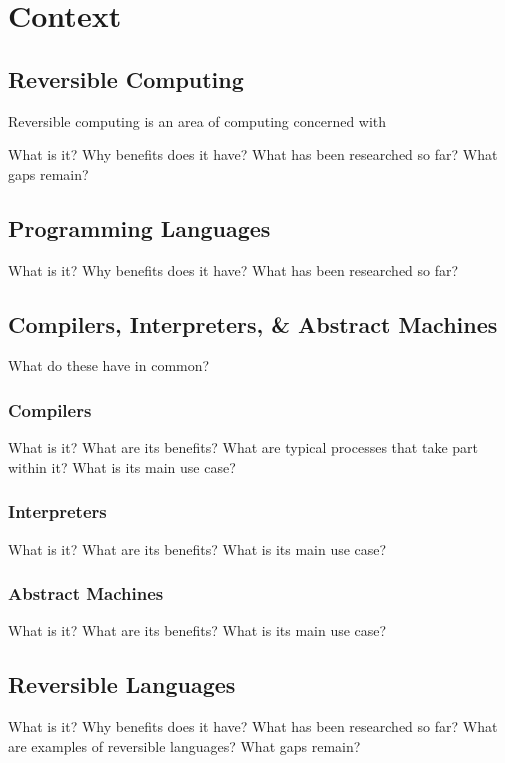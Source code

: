 \chapter{Context}


\section{Reversible Computing}

Reversible computing is an area of computing concerned with 

What is it?
Why benefits does it have?
What has been researched so far?
What gaps remain?

\section{Programming Languages}

What is it?
Why benefits does it have?
What has been researched so far?

\section{Compilers, Interpreters, \& Abstract Machines}

What do these have in common?

\subsection{Compilers}

What is it?
What are its benefits?
What are typical processes that take part within it?
What is its main use case?

\subsection{Interpreters}

What is it?
What are its benefits?
What is its main use case?

\subsection{Abstract Machines}

What is it?
What are its benefits?
What is its main use case?

\section{Reversible Languages}

What is it?
Why benefits does it have?
What has been researched so far?
What are examples of reversible languages?
What gaps remain?